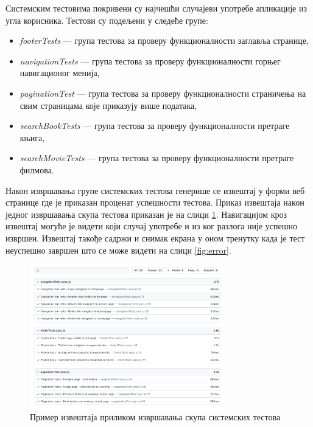 \documentclass[12pt,oneside]{memoir}
\begin{document}
Системским тестовима покривени су најчешћи случајеви употребе апликације из угла корисника. Тестови су подељени у следеће групе: \newpage
\begin{itemize}
\item \textit{footerTests} --- група тестова за проверу функционалности заглавља странице,
\item \textit{navigationTests} --- група тестова за проверу функционалности горњег навигационог менија,
\item \textit{paginationTest} --- група тестова за проверу функционалности страничења на свим страницама које приказују више података,
\item \textit{searchBookTests} --- група тестова за проверу функционалности претраге књига,
\item \textit{searchMovieTests} --- група тестова за проверу функционалности претраге филмова.
\end{itemize}

Након извршавања групе системских тестова генерише се извештај у форми веб странице где је приказан проценат успешности тестова. Приказ извештаја након једног извршавања скупа тестова приказан је на слици \ref{fig:e2e}. Навигацијом кроз извештај могуће је видети који случај употребе и из ког разлога није успешно извршен. Извештај такође садржи и снимак екрана у оном тренутку када је тест неуспешно завршен што се може видети на слици \ref{fig:error}.
 
 
 \begin{figure}[!ht]
  \centering
  \includegraphics[width=0.75\textwidth]{matfmaster/img/e2e.png}
  \caption{Пример извештаја приликом извршавања скупа системских тестова}
  \label{fig:e2e}
\end{figure}
\end{document}
